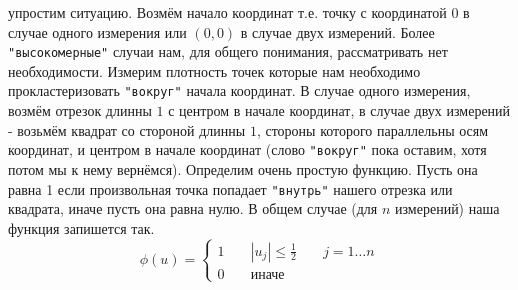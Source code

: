 \documentclass[11pt]{article}
\begin{document}
упростим ситуацию. Возмём начало координат т.е. точку с координатой $0$
в случае одного измерения или $(0, 0)$ в случае двух измерений. Более
\verb'"высокомерные"' случаи нам, для общего понимания, рассматривать
нет необходимости. Измерим плотность точек которые нам необходимо
прокластеризовать \verb'"вокруг"' начала координат. В случае одного
измерения, возмём отрезок длинны $1$ с центром в начале координат, в
случае двух измерений - возьмём квадрат со стороной длинны $1$, стороны
которого параллельны осям координат, и центром в начале координат (слово
\verb'"вокруг"' пока оставим, хотя потом мы к нему вернёмся). Определим
очень простую функцию. Пусть она равна 1 если произвольная точка
попадает \verb'"внутрь"' нашего отрезка или квадрата, иначе пусть она
равна нулю. В общем случае (для $n$ измерений) наша функция запишется
так. \[
\phi(u) = \left\lbrace
            \begin{aligned}
            1 && \; |u_j| \le \frac{1}{2} && \; j = 1\ldots n \\
            0 && \; \mbox{иначе} &&
           \end{aligned}
          \right.
\]
\end{document}
